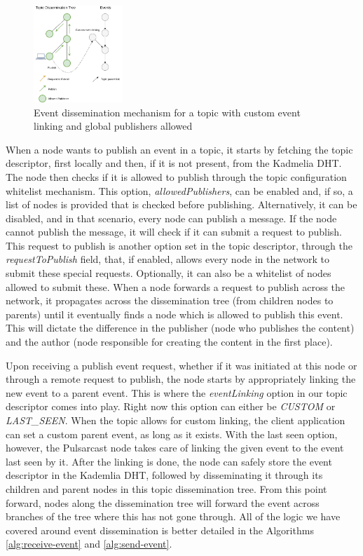 \begin{figure}[hb!]
  \centering
  \includegraphics[width=0.3\textwidth]{../images/pulsarcast-publish-custom.png}
  \caption{Event dissemination mechanism for a topic with custom event linking and global publishers allowed}
  \label{fig:pulsarcast-publish-custom}
\end{figure}

When a node wants to publish an event in a topic, it starts by fetching the
topic descriptor, first locally and then, if it is not present, from the
Kadmelia DHT. The node then checks if it is allowed to publish through the
topic configuration whitelist mechanism. This option, \emph{allowedPublishers},
can be enabled and, if so, a list of nodes is provided that is checked before
publishing. Alternatively, it can be disabled, and in that scenario, every node
can publish a message. If the node cannot publish the message, it will check if
it can submit a request to publish. This request to publish is another option
set in the topic descriptor, through the \emph{requestToPublish} field, that,
if enabled, allows every node in the network to submit these special requests.
Optionally, it can also be a whitelist of nodes allowed to submit these. When a
node forwards a request to publish across the network, it propagates across the
dissemination tree (from children nodes to parents) until it eventually finds a
node which is allowed to publish this event. This will dictate the difference
in the publisher (node who publishes the content) and the author (node
responsible for creating the content in the first place).

Upon receiving a publish event request, whether if it was initiated at this
node or through a remote request to publish, the node starts by appropriately
linking the new event to a parent event. This is where the \emph{eventLinking}
option in our topic descriptor comes into play. Right now this option can
either be \emph{CUSTOM} or \emph{LAST\_SEEN}. When the topic allows for custom
linking, the client application can set a custom parent event, as long as it
exists. With the last seen option, however, the Pulsarcast node takes care of
linking the given event to the event last seen by it. After the linking is
done, the node can safely store the event descriptor in the Kademlia DHT,
followed by disseminating it through its children and parent nodes in this
topic dissemination tree. From this point forward, nodes along the
dissemination tree will forward the event across branches of the tree where
this has not gone through. All of the logic we have covered around event
dissemination is better detailed in the Algorithms \ref{alg:receive-event} and
\ref{alg:send-event}.


